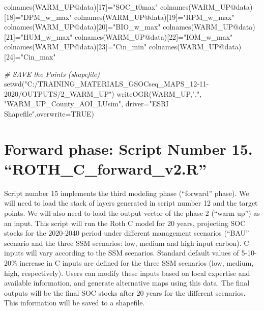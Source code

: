 \documentclass[
  10pt,
  b5paper,
]{book}
\newenvironment{Shaded}{\begin{snugshade}}{\end{snugshade}}
\newcommand{\AttributeTok}[1]{\textcolor[rgb]{0.77,0.63,0.00}{#1}}
\newcommand{\CommentTok}[1]{\textcolor[rgb]{0.56,0.35,0.01}{\textit{#1}}}
\newcommand{\ConstantTok}[1]{\textcolor[rgb]{0.00,0.00,0.00}{#1}}
\newcommand{\DecValTok}[1]{\textcolor[rgb]{0.00,0.00,0.81}{#1}}
\newcommand{\FunctionTok}[1]{\textcolor[rgb]{0.00,0.00,0.00}{#1}}
\newcommand{\NormalTok}[1]{#1}
\newcommand{\OtherTok}[1]{\textcolor[rgb]{0.56,0.35,0.01}{#1}}
\newcommand{\SpecialCharTok}[1]{\textcolor[rgb]{0.00,0.00,0.00}{#1}}
\newcommand{\StringTok}[1]{\textcolor[rgb]{0.31,0.60,0.02}{#1}}
\begin{document}
\begin{Shaded}
\begin{Highlighting}[]
\FunctionTok{colnames}\NormalTok{(WARM\_UP}\SpecialCharTok{@}\NormalTok{data)[}\DecValTok{17}\NormalTok{]}\OtherTok{=}\StringTok{"SOC\_t0max"}
\FunctionTok{colnames}\NormalTok{(WARM\_UP}\SpecialCharTok{@}\NormalTok{data)[}\DecValTok{18}\NormalTok{]}\OtherTok{=}\StringTok{"DPM\_w\_max"}
\FunctionTok{colnames}\NormalTok{(WARM\_UP}\SpecialCharTok{@}\NormalTok{data)[}\DecValTok{19}\NormalTok{]}\OtherTok{=}\StringTok{"RPM\_w\_max"}
\FunctionTok{colnames}\NormalTok{(WARM\_UP}\SpecialCharTok{@}\NormalTok{data)[}\DecValTok{20}\NormalTok{]}\OtherTok{=}\StringTok{"BIO\_w\_max"}
\FunctionTok{colnames}\NormalTok{(WARM\_UP}\SpecialCharTok{@}\NormalTok{data)[}\DecValTok{21}\NormalTok{]}\OtherTok{=}\StringTok{"HUM\_w\_max"}
\FunctionTok{colnames}\NormalTok{(WARM\_UP}\SpecialCharTok{@}\NormalTok{data)[}\DecValTok{22}\NormalTok{]}\OtherTok{=}\StringTok{"IOM\_w\_max"}
\FunctionTok{colnames}\NormalTok{(WARM\_UP}\SpecialCharTok{@}\NormalTok{data)[}\DecValTok{23}\NormalTok{]}\OtherTok{=}\StringTok{"Cin\_min"}
\FunctionTok{colnames}\NormalTok{(WARM\_UP}\SpecialCharTok{@}\NormalTok{data)[}\DecValTok{24}\NormalTok{]}\OtherTok{=}\StringTok{"Cin\_max"}


\CommentTok{\# SAVE the Points (shapefile)}
\FunctionTok{setwd}\NormalTok{(}\StringTok{"C:/TRAINING\_MATERIALS\_GSOCseq\_MAPS\_12{-}11{-}2020/OUTPUTS/2\_WARM\_UP"}\NormalTok{)}
\FunctionTok{writeOGR}\NormalTok{(WARM\_UP,}\StringTok{"."}\NormalTok{, }\StringTok{"WARM\_UP\_County\_AOI\_LUsim"}\NormalTok{, }\AttributeTok{driver=}\StringTok{"ESRI Shapefile"}\NormalTok{,}\AttributeTok{overwrite=}\ConstantTok{TRUE}\NormalTok{)}
\end{Highlighting}
\end{Shaded}

\hypertarget{forward-phase-script-number-15.-roth_c_forward_v2.r}{%
\section{Forward phase: Script Number 15. ``ROTH\_C\_forward\_v2.R''}\label{forward-phase-script-number-15.-roth_c_forward_v2.r}}

Script number 15 implements the third modeling phase (``forward'' phase). We will need to load the stack of layers generated in script number 12 and the target points. We will also need to load the output vector of the phase 2 (``warm up'') as an input. This script will run the Roth C model for 20 years, projecting SOC stocks for the 2020-2040 period under different management scenarios (``BAU'' scenario and the three SSM scenarios: low, medium and high input carbon). C inputs will vary according to the SSM scenarios. Standard default values of 5-10-20\% increase in C inputs are defined for the three SSM scenarios (low, medium, high, respectively). Users can modify these inputs based on local expertise and available information, and generate alternative maps using this data. The final outputs will be the final SOC stocks after 20 years for the different scenarios. This information will be saved to a shapefile.
\end{document}
